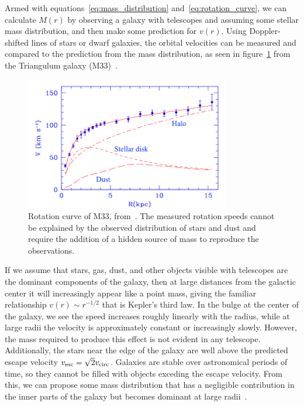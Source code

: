 Armed with equations~\eqref{eq:mass_distribution} and~\eqref{eq:rotation_curve}, we can calculate $M(r)$ by observing a galaxy with telescopes and assuming some stellar mass distribution, and then make some prediction for $v(r)$. Using Doppler-shifted lines of stars or dwarf galaxies, the orbital velocities can be measured and compared to the prediction from the mass distribution, as seen in figure~\ref{fig:rotation_curve} from the Triangulum galaxy (M33)~\cite{Corbelli:1999af}.

\begin{figure}[htb]
\centering
    \includegraphics[width=0.8\textwidth]{figures/dm/m33_rotation}
    \caption{Rotation curve of M33, from~\cite{Corbelli:1999af}. The measured rotation speeds cannot be explained by the observed distribution of stars and dust and require the addition of a hidden source of mass to reproduce the observations.}\label{fig:rotation_curve}
\end{figure}

If we assume that stars, gas, dust, and other objects visible with telescopes are the dominant components of the galaxy, then at large distances from the galactic center it will increasingly appear like a point mass, giving the familiar relationship $v(r) \sim r^{-1/2}$ that is Kepler's third law. In the bulge at the center of the galaxy, we see the speed increases roughly linearly with the radius, while at large radii the velocity is approximately constant or increasingly slowly. However, the mass required to produce this effect is not evident in any telescope. Additionally, the stars near the edge of the galaxy are well above the predicted escape velocity $v_{\mathrm{esc}} = \sqrt{2}v_{\mathrm{circ}}$. Galaxies are stable over astronomical periods of time, so they cannot be filled with objects exceding the escape velocity. From this, we can propose some mass distribution that has a negligible contribution in the inner parts of the galaxy but becomes dominant at large radii~\cite{Navarro:1995iw,Graham:2005xx}.

